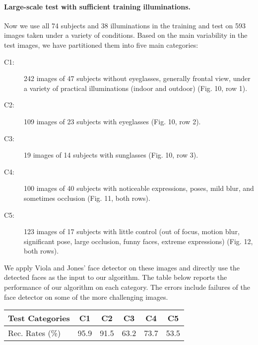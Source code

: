 \documentclass[10pt,twocolumn,letterpaper]{article}
\begin{document}
\paragraph{Large-scale test with sufficient training illuminations.}
Now we use all 74 subjects and 38 illuminations in the training and test on 593 images taken under a variety of conditions. Based on the main variability in the test images, we have partitioned them into five main categories:%
\begin{small}
\begin{description}
\item[C1:] 242 images of 47 subjects without eyeglasses, generally frontal view, under a variety of practical illuminations (indoor and outdoor) (Fig. 10, row 1). %
\item[C2:] 109 images of 23 subjects with eyeglasses (Fig. 10, row 2).%
\item[C3:] 19 images of 14 subjects with sunglasses (Fig. 10, row 3).%
\item[C4:] 100 images of 40 subjects with noticeable expressions, poses, mild blur, and sometimes occlusion (Fig. 11, both rows).%
\item[C5:] 123 images of 17 subjects with little control (out of focus, motion blur, significant pose, large occlusion, funny faces, extreme expressions) (Fig. 12, both rows).%
\end{description}
\end{small}
We apply Viola and Jones' face detector on these images and directly use the detected faces as the input to our algorithm. The table below reports the performance of our algorithm on each category. The errors include failures of the face detector on some of the more challenging images.\vspace{-1mm}
\begin{table}[h]	
\centering
\begin{tabular}{|l|c|c|c|c|c| }
\hline
Test Categories & C1 & C2 & C3 & C4 & C5  \\
\hline
\hline
Rec. Rates (\%) &  95.9 & 91.5 & 63.2 & 73.7 & 53.5 \\
\hline
\end{tabular} \vspace{-1mm}
\end{table}
\end{document}

